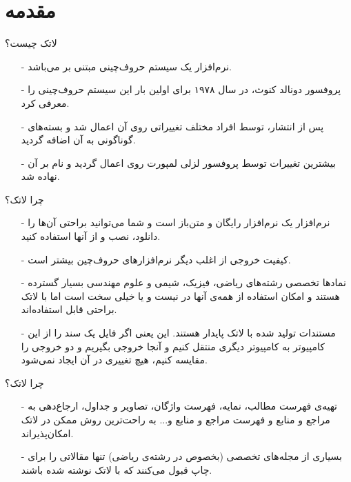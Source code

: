 \section{مقدمه}

\begin{frame}{لاتک چیست؟}
\begin{itemize}\itemr
\item[-]
نرم‌افزار 
\lr{\LaTeX}
یک سیستم حروف‌چینی‌ مبتنی بر 
\lr{\TeX}
می‌باشد.

\item[-]
پروفسور دونالد کنوث، در سال ۱۹۷۸ برای اولین بار این سیستم حروف‌چینی را معرفی کرد.

\item[-]
پس از انتشار، 
\lr{\TeX}
توسط افراد مختلف تغییراتی روی آن اعمال شد و بسته‌‌های گوناگونی به آن اضافه گردید.

\item[-]
بیشترین تغییرات توسط پروفسور لزلی لمپورت روی 
\lr{\TeX}
اعمال گردید و نام 
\lr{\LaTeX}
بر آن نهاده شد.
\end{itemize}
\end{frame}

\begin{frame}{چرا لاتک؟}
\begin{itemize}\itemr
\item[-]
نرم‌افزار
\lr{\LaTeX}
یک نرم‌افزار رایگان و متن‌باز است و شما می‌توانید براحتی آن‌ها را دانلود، نصب و از آنها استفاده کنید.

\item[-]
کیفیت خروجی 
\lr{\LaTeX}
از اغلب دیگر نرم‌افزار‌های حروف‌چین بیشتر است.

\item[-]
نماد‌ها تخصصی رشته‌های ریاضی، فیزیک، شیمی و علوم مهندسی بسیار گسترده هستند و امکان استفاده از همه‌ی آنها در 
نیست و یا خیلی سخت است اما با لاتک براحتی قابل استفاده‌اند.

\item[-]
مستندات تولید شده با لاتک پایدار هستند. این یعنی اگر فایل 
یک سند را از این کامپیوتر به کامپیوتر دیگری منتقل کنیم و آنجا خروجی بگیریم و دو خروجی را مقایسه کنیم، هیچ تغییری در آن ایجاد نمی‌شود.
\end{itemize}
\end{frame}

\begin{frame}{چرا لاتک؟}
\begin{itemize}\itemr
\item[-]
تهیه‌ی فهرست مطالب، نمایه، فهرست واژگان، تصاویر و جداول، ارجاع‌دهی به مراجع و منابع و فهرست مراجع و منابع و... به راحت‌ترین روش ممکن در لاتک امکان‌پذیراند.

\item[-]
بسیاری از مجله‌های تخصصی (بخصوص در رشته‌ی ریاضی) تنها مقالاتی را برای چاپ قبول می‌کنند که با لاتک نوشته شده باشند.
\end{itemize}
\end{frame}


